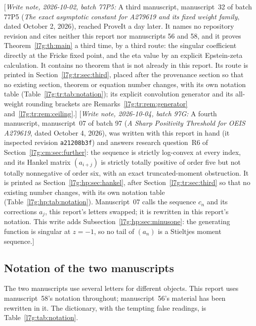 \documentclass[11pt,letterpaper]{article}
\theoremstyle{remark}\newtheorem{remark}[theorem]{Remark}
\newcommand{\writenote}[1]{\textup{[}\emph{Write note, 2026-10-02, batch 77P5:} #1\textup{]}}
\newcommand{\hpnote}[1]{\textup{[}\emph{Write note, 2026-10-04, batch 97G:} #1\textup{]}}
\newcounter{l7gtrsavedeq}
\begin{document}
\writenote{A third manuscript, manuscript~32 of batch 77P5 (\emph{The exact
asymptotic constant for A279619 and its fixed weight family}, dated
October 2, 2026), reached ProveIt a day later. It names no repository
revision and cites neither this report nor manuscripts 56 and 58, and it
proves Theorem~\ref{l7g:th:main} a third time, by a third route: the
singular coefficient directly at the Fricke fixed point, and the eta value
by an explicit Epstein-zeta calculation. It contains no theorem that is not
already in this report. Its route is printed in
Section~\ref{l7g:tr:sec:third}, placed after the provenance section so that
no existing section, theorem or equation number changes, with its own
notation table (Table~\ref{l7g:tr:tab:notation}); its explicit
convolution generator and its all-weight rounding brackets are
Remarks~\ref{l7g:tr:rem:generator} and~\ref{l7g:tr:rem:ceiling}.}
\hpnote{A fourth manuscript, manuscript~07 of batch 97 (\emph{A Sharp
Positivity Threshold for OEIS A279619}, dated October 4, 2026), was written
with this report in hand (it inspected revision \texttt{a21208b3f}) and
answers research question~R6 of Section~\ref{l7g:cm:sec:further}: the
sequence is strictly log-convex at every index, and its Hankel matrix
$(a_{i+j})$ is strictly totally positive of order five but not totally
nonnegative of order six, with an exact truncated-moment obstruction. It is
printed as Section~\ref{l7g:hp:sec:hankel}, after
Section~\ref{l7g:tr:sec:third} so that no existing number changes, with its
own notation table (Table~\ref{l7g:hp:tab:notation}). Manuscript~07 calls
the sequence $c_n$ and its corrections $a_j$, this report's letters swapped;
it is rewritten in this report's notation. This write adds
Subsection~\ref{l7g:hp:sec:minusone}: the generating function is singular
at $z=-1$, so no tail of $(a_n)$ is a Stieltjes moment sequence.}

\subsection{Notation of the two manuscripts}\label{l7g:sec:notation}
The two manuscripts use several letters for different objects. This report
uses manuscript~58's notation throughout; manuscript~56's material has been
rewritten in it. The dictionary, with the tempting false readings, is
Table~\ref{l7g:tab:notation}.
\end{document}

